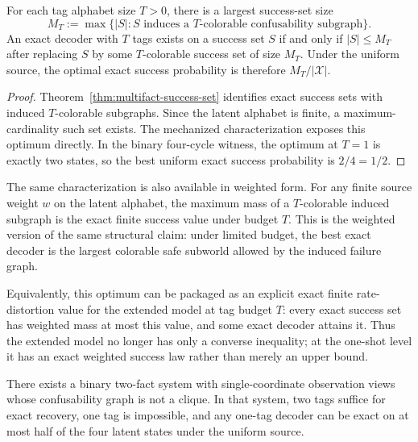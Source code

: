 \begin{theorem}\label{thm:multifact-max-success}
For each tag alphabet size $T>0$, there is a largest success-set size
\[
M_T := \max\{|S| : S \text{ induces a } T\text{-colorable confusability subgraph}\}.
\]
An exact decoder with $T$ tags exists on a success set $S$ if and only if $|S|\le M_T$ after replacing $S$ by some $T$-colorable success set of size $M_T$. Under the uniform source, the optimal exact success probability is therefore $M_T/|\mathcal X|$.
\end{theorem}

\begin{proof}
Theorem~\ref{thm:multifact-success-set} identifies exact success sets with induced $T$-colorable subgraphs. Since the latent alphabet is finite, a maximum-cardinality such set exists. The mechanized characterization exposes this optimum directly. In the binary four-cycle witness, the optimum at $T=1$ is exactly two states, so the best uniform exact success probability is $2/4=1/2$.
\end{proof}

The same characterization is also available in weighted form. For any finite source weight $w$ on the latent alphabet, the maximum mass of a $T$-colorable induced subgraph is the exact finite success value under budget $T$. This is the weighted version of the same structural claim: under limited budget, the best exact decoder is the largest colorable safe subworld allowed by the induced failure graph.

Equivalently, this optimum can be packaged as an explicit exact finite rate-distortion value for the extended model at tag budget $T$: every exact success set has weighted mass at most this value, and some exact decoder attains it. Thus the extended model no longer has only a converse inequality; at the one-shot level it has an exact weighted success law rather than merely an upper bound.

\begin{theorem}\label{thm:multifact-nonclique}
There exists a binary two-fact system with single-coordinate observation views whose confusability graph is not a clique. In that system, two tags suffice for exact recovery, one tag is impossible, and any one-tag decoder can be exact on at most half of the four latent states under the uniform source.
\end{theorem}

